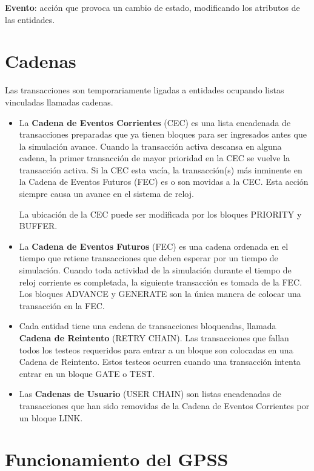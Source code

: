 \documentclass[12pt,a4paper, twoside]{paquetes-apunte/apunte}
\begin{document}
\textbf{Evento}: acción que provoca un cambio de estado, modificando
los atributos de las entidades.


\section{Cadenas}

Las transacciones son temporariamente ligadas a entidades ocupando
listas vinculadas llamadas cadenas.
\begin{itemize}
\item La \textbf{Cadena de Eventos Corrientes} (CEC) es una lista encadenada
de transacciones preparadas que ya tienen bloques para ser ingresados
antes que la simulación avance. Cuando la transacción activa descansa
en alguna cadena, la primer transacción de mayor prioridad en la CEC
se vuelve la transacción activa. Si la CEC esta vacía, la transacción(s)
más inminente en la Cadena de Eventos Futuros (FEC) es o son movidas
a la CEC. Esta acción siempre causa un avance en el sistema de reloj.


La ubicación de la CEC puede ser modificada por los bloques PRIORITY
y BUFFER.

\item La \textbf{Cadena de Eventos Futuros }(FEC) es una cadena ordenada
en el tiempo que retiene transacciones que deben esperar por un tiempo
de simulación. Cuando toda actividad de la simulación durante el tiempo
de reloj corriente es completada, la siguiente transacción es tomada
de la FEC. Los bloques ADVANCE y GENERATE son la única manera de colocar
una transacción en la FEC.
\item Cada entidad tiene una cadena de transacciones bloqueadas, llamada
\textbf{Cadena de Reintento} (RETRY CHAIN). Las transacciones que
fallan todos los testeos requeridos para entrar a un bloque son colocadas
en una Cadena de Reintento. Estos testeos ocurren cuando una transacción
intenta entrar en un bloque GATE o TEST.
\item Las \textbf{Cadenas de Usuario }(USER CHAIN) son listas encadenadas
de transacciones que han sido removidas de la Cadena de Eventos Corrientes
por un bloque LINK.
\end{itemize}

\section{Funcionamiento del GPSS}
\end{document}

